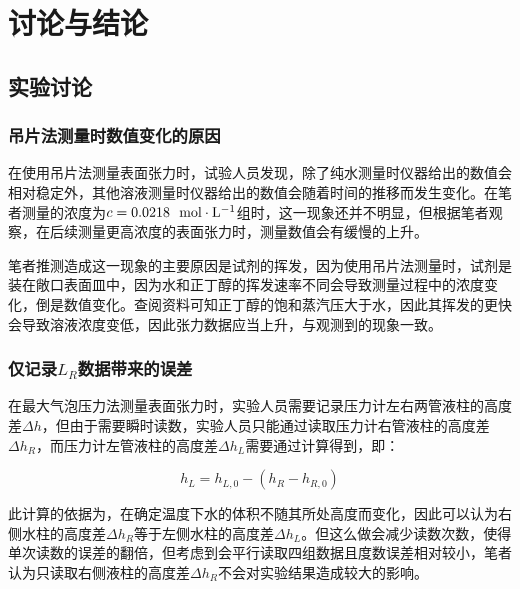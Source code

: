 \documentclass[12pt]{article}
\begin{document}
		\section{讨论与结论}
			\subsection{实验讨论}
			\subsubsection{吊片法测量时数值变化的原因}
			在使用吊片法测量表面张力时，试验人员发现，除了纯水测量时仪器给出的数值会相对稳定外，其他溶液测量时仪器给出的数值会随着时间的推移而发生变化。在笔者测量的浓度为$c=0.0218\ \ {\rm mol\cdot L^{-1}}$组时，这一现象还并不明显，但根据笔者观察，在后续测量更高浓度的表面张力时，测量数值会有缓慢的上升。\par
			笔者推测造成这一现象的主要原因是试剂的挥发，因为使用吊片法测量时，试剂是装在敞口表面皿中，因为水和正丁醇的挥发速率不同会导致测量过程中的浓度变化，倒是数值变化。查阅资料\citealp{dean1992lange}可知正丁醇的饱和蒸汽压大于水，因此其挥发的更快会导致溶液浓度变低，因此张力数据应当上升，与观测到的现象一致。\par
			\subsubsection{仅记录$L_{R}$数据带来的误差}
			在最大气泡压力法测量表面张力时，实验人员需要记录压力计左右两管液柱的高度差$\Delta h$，但由于需要瞬时读数，实验人员只能通过读取压力计右管液柱的高度差$\Delta h_{R}$，而压力计左管液柱的高度差$\Delta h_{L}$需要通过计算得到，即：\par
			$$
			h_{L}=h_{L,0}-(h_{R}-h_{R,0})
			$$\par
			此计算的依据为，在确定温度下水的体积不随其所处高度而变化，因此可以认为右侧水柱的高度差$\Delta h_{R}$等于左侧水柱的高度差$\Delta h_{L}$。但这么做会减少读数次数，使得单次读数的误差的翻倍，但考虑到会平行读取四组数据且度数误差相对较小，笔者认为只读取右侧液柱的高度差$\Delta h_{R}$不会对实验结果造成较大的影响。\par
\end{document}
